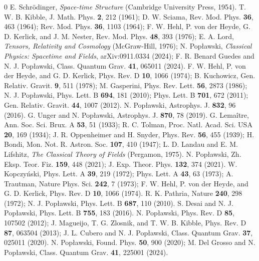\documentclass[prd,onecolumn,nofootinbib]{revtex4}
\begin{document}
\begin{thebibliography}{0}
 E. Schr\"{o}dinger, {\em Space-time Structure} (Cambridge University Press, 1954).
 T. W. B. Kibble, J. Math. Phys. {\bf 2}, 212 (1961); D. W. Sciama, Rev. Mod. Phys. {\bf 36}, 463 (1964); Rev. Mod. Phys. {\bf 36}, 1103 (1964); F. W. Hehl, P. von der Heyde, G. D. Kerlick, and J. M. Nester, Rev. Mod. Phys. {\bf 48}, 393 (1976); E. A. Lord, {\em Tensors, Relativity and Cosmology} (McGraw-Hill, 1976); N. Pop{\l}awski, {\em Classical Physics: Spacetime and Fields}, arXiv:0911.0334 (2024); F. R. Benard Guedes and N. J. Pop{\l}awski, Class. Quantum Grav. {\bf 41}, 065011 (2024). 
 F. W. Hehl, P. von der Heyde, and G. D. Kerlick, Phys. Rev. D {\bf 10}, 1066 (1974); B. Kuchowicz, Gen. Relativ. Gravit. {\bf 9}, 511 (1978); M. Gasperini, Phys. Rev. Lett. {\bf 56}, 2873 (1986); N. J. Pop{\l}awski, Phys. Lett. B {\bf 694}, 181 (2010); Phys. Lett. B {\bf 701}, 672 (2011); Gen. Relativ. Gravit. {\bf 44}, 1007 (2012).
 N. Pop{\l}awski, Astrophys. J. {\bf 832}, 96 (2016).
 G. Unger and N. Pop{\l}awski, Astrophys. J. {\bf 870}, 78 (2019).
 G. Lema\^{i}tre, Ann. Soc. Sci. Brux. A {\bf 53}, 51 (1933); R. C. Tolman, Proc. Natl. Acad. Sci. USA {\bf 20}, 169 (1934); J. R. Oppenheimer and H. Snyder, Phys. Rev. {\bf 56}, 455 (1939); H. Bondi, Mon. Not. R. Astron. Soc. {\bf 107}, 410 (1947); L. D. Landau and E. M. Lifshitz, {\em The Classical Theory of Fields} (Pergamon, 1975).
 N. Pop{\l}awski, Zh. Eksp. Teor. Fiz. {\bf 159}, 448 (2021); J. Exp. Theor. Phys. {\bf 132}, 374 (2021).
 W. Kopczy\'{n}ski, Phys. Lett. A {\bf 39}, 219 (1972); Phys. Lett. A {\bf 43}, 63 (1973); A. Trautman, Nature Phys. Sci. {\bf 242}, 7 (1973); F. W. Hehl, P. von der Heyde, and G. D. Kerlick, Phys. Rev. D {\bf 10}, 1066 (1974).
 R. K. Pathria, Nature {\bf 240}, 298 (1972); N. J. Pop{\l}awski, Phys. Lett. B {\bf 687}, 110 (2010).
 S. Desai and N. J. Pop{\l}awski, Phys. Lett. B {\bf 755}, 183 (2016).
 N. Pop{\l}awski, Phys. Rev. D {\bf 85}, 107502 (2012); J. Magueijo, T. G. Zlosnik, and T. W. B. Kibble, Phys. Rev. D {\bf 87}, 063504 (2013); J. L. Cubero and N. J. Pop{\l}awski, Class. Quantum Grav. {\bf 37}, 025011 (2020).
 N. Pop{\l}awski, Found. Phys. {\bf 50}, 900 (2020); M. Del Grosso and N. Pop{\l}awski, Class. Quantum Grav. {\bf 41}, 225001 (2024).
\end{thebibliography}
\end{document}
